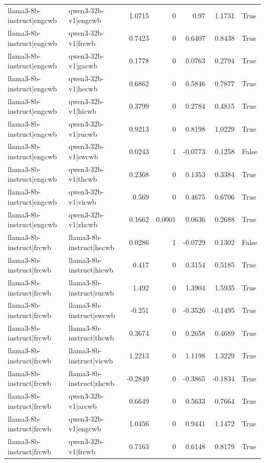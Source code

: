 \begin{table}
\begin{tabular}{l l r r r r l}
llama3-8b-instruct|engcwb & qwen3-32b-v1|engcwb & 1.0715 & 0 & 0.97 & 1.1731 & True \\
llama3-8b-instruct|engcwb & qwen3-32b-v1|frcwb & 0.7423 & 0 & 0.6407 & 0.8438 & True \\
llama3-8b-instruct|engcwb & qwen3-32b-v1|gacwb & 0.1778 & 0 & 0.0763 & 0.2794 & True \\
llama3-8b-instruct|engcwb & qwen3-32b-v1|hecwb & 0.6862 & 0 & 0.5846 & 0.7877 & True \\
llama3-8b-instruct|engcwb & qwen3-32b-v1|hicwb & 0.3799 & 0 & 0.2784 & 0.4815 & True \\
llama3-8b-instruct|engcwb & qwen3-32b-v1|rucwb & 0.9213 & 0 & 0.8198 & 1.0229 & True \\
llama3-8b-instruct|engcwb & qwen3-32b-v1|swcwb & 0.0243 & 1 & -0.0773 & 0.1258 & False \\
llama3-8b-instruct|engcwb & qwen3-32b-v1|thcwb & 0.2368 & 0 & 0.1353 & 0.3384 & True \\
llama3-8b-instruct|engcwb & qwen3-32b-v1|vicwb & 0.569 & 0 & 0.4675 & 0.6706 & True \\
llama3-8b-instruct|engcwb & qwen3-32b-v1|zhcwb & 0.1662 & 0.0001 & 0.0636 & 0.2688 & True \\
llama3-8b-instruct|frcwb & llama3-8b-instruct|hecwb & 0.0286 & 1 & -0.0729 & 0.1302 & False \\
llama3-8b-instruct|frcwb & llama3-8b-instruct|hicwb & 0.417 & 0 & 0.3154 & 0.5185 & True \\
llama3-8b-instruct|frcwb & llama3-8b-instruct|rucwb & 1.492 & 0 & 1.3904 & 1.5935 & True \\
llama3-8b-instruct|frcwb & llama3-8b-instruct|swcwb & -0.251 & 0 & -0.3526 & -0.1495 & True \\
llama3-8b-instruct|frcwb & llama3-8b-instruct|thcwb & 0.3674 & 0 & 0.2658 & 0.4689 & True \\
llama3-8b-instruct|frcwb & llama3-8b-instruct|vicwb & 1.2213 & 0 & 1.1198 & 1.3229 & True \\
llama3-8b-instruct|frcwb & llama3-8b-instruct|zhcwb & -0.2849 & 0 & -0.3865 & -0.1834 & True \\
llama3-8b-instruct|frcwb & qwen3-32b-v1|arcwb & 0.6649 & 0 & 0.5633 & 0.7664 & True \\
llama3-8b-instruct|frcwb & qwen3-32b-v1|engcwb & 1.0456 & 0 & 0.9441 & 1.1472 & True \\
llama3-8b-instruct|frcwb & qwen3-32b-v1|frcwb & 0.7163 & 0 & 0.6148 & 0.8179 & True \\

\end{tabular}
\end{table}
